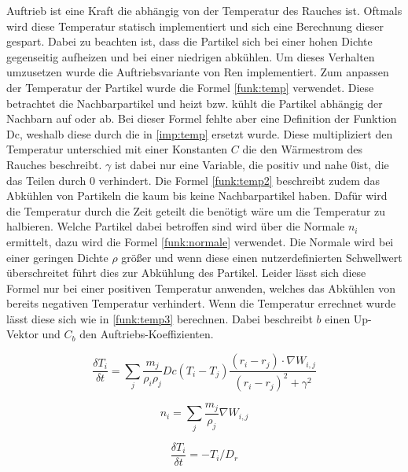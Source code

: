 \documentclass[intern,palatino]{cgBA}
\begin{document}
Auftrieb ist eine Kraft die abhängig von der Temperatur des Rauches ist. Oftmals wird diese Temperatur statisch implementiert und sich eine Berechnung dieser gespart. Dabei zu beachten ist, dass die Partikel sich bei einer hohen Dichte gegenseitig aufheizen und bei einer niedrigen abkühlen. Um dieses Verhalten umzusetzen wurde die Auftriebsvariante von Ren \cite{ren2016fast} implementiert.
\newline
Zum anpassen der Temperatur der Partikel wurde die Formel \ref{funk:temp} verwendet. Diese betrachtet die Nachbarpartikel und heizt bzw. kühlt die Partikel abhängig der Nachbarn auf oder ab. Bei dieser Formel fehlte aber eine Definition der Funktion Dc, weshalb diese durch die in \ref{imp:temp} ersetzt wurde. Diese multipliziert den Temperatur unterschied mit einer Konstanten $C$ die den Wärmestrom des Rauches beschreibt. $\gamma$ ist dabei nur eine Variable, die positiv und nahe $0$ist, die das Teilen durch $0$ verhindert.
\newline
Die Formel \ref{funk:temp2} beschreibt zudem das Abkühlen von Partikeln die kaum bis keine Nachbarpartikel haben. Dafür wird die Temperatur durch die Zeit geteilt die benötigt wäre um die Temperatur zu halbieren. Welche Partikel dabei betroffen sind wird über die Normale $n_i$ ermittelt, dazu wird die Formel \ref{funk:normale} verwendet. Die Normale wird bei einer geringen Dichte $\rho$ größer und wenn diese einen nutzerdefinierten Schwellwert überschreitet führt dies zur Abkühlung des Partikel. Leider lässt sich diese Formel nur bei einer positiven Temperatur anwenden, welches das Abkühlen von bereits negativen Temperatur verhindert.
\newline
Wenn die Temperatur errechnet wurde lässt diese sich wie in \ref{funk:temp3} berechnen. Dabei beschreibt $b$ einen Up-Vektor und $C_b$ den Auftriebs-Koeffizienten.

\begin{equation}\label{funk:temp}
\frac{\delta T_i}{\delta t}  = \sum_j \frac{m_j}{\rho_i \rho_j} Dc(T_i - T_j) \frac{(r_i-r_j) \cdot \nabla W_{i,j}}{(r_i-r_j)^2 + \gamma^2}
\end{equation}

\begin{equation}\label{funk:normale}
n_i  = \sum_j \frac{m_j}{\rho_j} \nabla W_{i,j}
\end{equation}

\begin{equation}\label{funk:temp2}
\frac{\delta T_i}{\delta t}  = - T_i/D_r
\end{equation}
\end{document}

